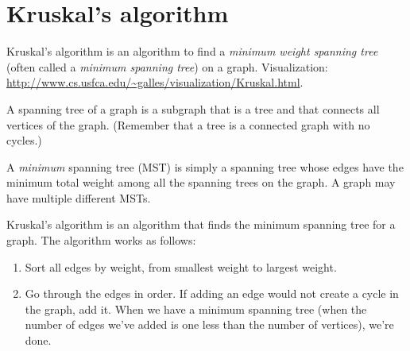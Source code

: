 \section*{Kruskal's algorithm%
}

Kruskal's algorithm is an algorithm to find a \emph{minimum weight
  spanning tree} (often called a \emph{minimum spanning tree}) on a
graph. Visualization:
\url{http://www.cs.usfca.edu/~galles/visualization/Kruskal.html}.

A spanning tree of a graph is a subgraph that is a tree and that
connects all vertices of the graph.  (Remember that a tree is a
connected graph with no cycles.)

A \emph{minimum} spanning tree (MST) is simply a spanning tree whose
edges have the minimum total weight among all the spanning trees on the graph.
A graph may have multiple different MSTs.

Kruskal's algorithm is an algorithm that finds the minimum spanning
tree for a graph. The algorithm works as follows:
\begin{enumerate}[1.]
\item%
  Sort all edges by weight, from smallest weight to largest weight.
\item%
  Go through the edges in order. If adding an edge would not create a
  cycle in the graph, add it. When we have a minimum spanning tree
  (when the number of edges we've added is one less than the number of
  vertices), we're done.
\end{enumerate}
